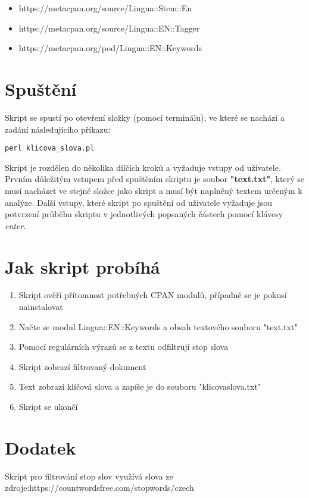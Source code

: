 \documentclass[a4paper,11pt]{article}
\theoremstyle{mytheor}
\begin{document}
\begin{itemize}
\item https://metacpan.org/source/Lingua::Stem::En
\item https://metacpan.org/source/Lingua::EN::Tagger
\item https://metacpan.org/pod/Lingua::EN::Keywords
\end{itemize}

\section*{Spuštění}

Skript se spustí po otevření složky (pomocí terminálu), ve které se nachází
a zadání následujícího příkazu:




\begin{lstlisting}[label={list:first},caption=Příkaz pro spuštění skriptu --
Analyzátor klíčových slov.]
perl klicova_slova.pl
\end{lstlisting}
Skript je rozdělen do několika dílčích kroků a vyžaduje vstupy od uživatele.
Prvním důležitým vstupem před spuštěním skriptu je soubor \textbf{"text.txt"}, který
se musí nacházet ve stejné složce jako skript a musí být naplněný textem
určeným k analýze. Další vstupy, které skript po spuštění od uživatele
vyžaduje jsou potvrzení průběhu skriptu v jednotlivých popsaných částech
pomocí klávesy \textit{enter}.

\section*{Jak skript probíhá}

\begin{enumerate}
\item Skript ověří přítomnost potřebných CPAN modulů, případně se je pokusí nainstalovat
\item Načte se modul Lingua::EN::Keywords a obsah textového souboru "text.txt"
\item Pomocí regulárních výrazů se z textu odfiltrují stop slova
\item Skript zobrazí filtrovaný dokument
\item Text zobrazí klíčová slova a zapíše je do souboru "klicovaslova.txt"
\item Skript se ukončí
\end{enumerate}
\section*{Dodatek}

Skript pro filtrování stop slov využívá slova ze
zdroje:https://countwordsfree.com/stopwords/czech
\end{document}
